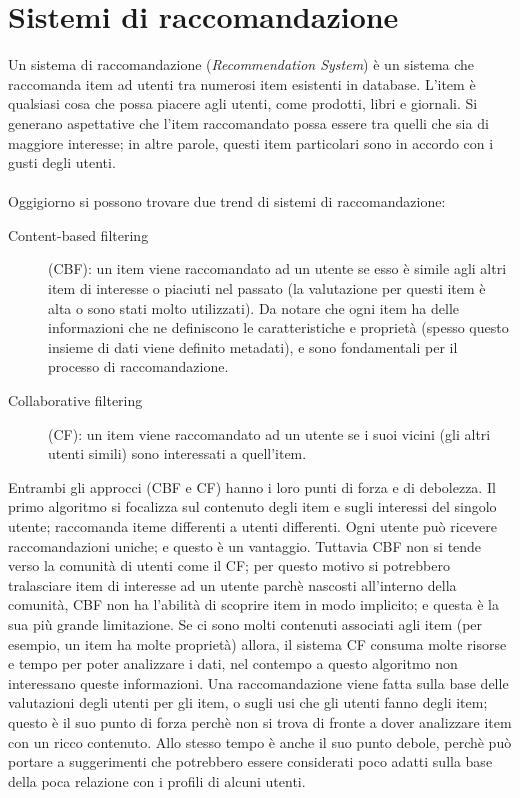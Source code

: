 \section{Sistemi di raccomandazione}
Un sistema di raccomandazione (\textit{Recommendation System}) è un sistema che raccomanda item ad utenti tra numerosi item esistenti 
in database. L'item è qualsiasi cosa che possa piacere agli utenti, come prodotti, libri e giornali. Si generano aspettative che 
l'item raccomandato possa essere tra quelli che sia di maggiore interesse; in altre parole, questi item particolari sono in accordo 
con i gusti degli utenti. 
\\
\\
Oggigiorno si possono trovare due trend di sistemi di raccomandazione: 
\begin{description}
	\item[Content-based filtering](CBF): un item viene raccomandato ad un utente se esso è simile agli altri item di interesse o piaciuti
	nel passato (la valutazione per questi item è alta o sono stati molto utilizzati). Da notare che ogni item ha delle informazioni che
	ne definiscono le caratteristiche e proprietà (spesso questo insieme di dati viene definito metadati), e sono fondamentali per il 
	processo di raccomandazione. 
	\item[Collaborative filtering](CF): un item viene raccomandato ad un utente se i suoi vicini (gli altri utenti simili) sono interessati
	a quell'item.   
\end{description}

Entrambi gli approcci (CBF e CF) hanno i loro punti di forza e di debolezza. Il primo algoritmo si focalizza sul contenuto degli item e
sugli interessi del singolo utente; raccomanda iteme differenti a utenti differenti. Ogni utente può ricevere raccomandazioni uniche; e 
questo è un vantaggio. Tuttavia CBF non si tende verso la comunità di utenti come il CF; per questo motivo si potrebbero tralasciare 
item di interesse ad un utente parchè nascosti all'interno della comunità, CBF non ha l'abilità di scoprire item in modo implicito; e 
questa è la sua più grande limitazione.
Se ci sono molti contenuti associati agli item (per esempio, un item ha molte proprietà) allora, il sistema CF consuma molte risorse e 
tempo per poter analizzare i dati, nel contempo a questo algoritmo non interessano queste informazioni. Una raccomandazione viene fatta
sulla base delle valutazioni degli utenti per gli item, o sugli usi che gli utenti fanno degli item; questo è il suo punto di forza 
perchè non si trova di fronte a dover analizzare item con un ricco contenuto. Allo stesso tempo è anche il suo punto debole, perchè può
portare a suggerimenti che potrebbero essere considerati poco adatti sulla base della poca relazione con i profili di alcuni utenti.

